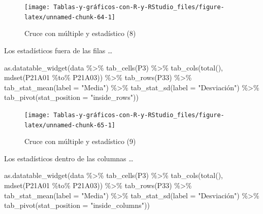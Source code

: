 \documentclass[
]{book}
\newenvironment{Shaded}{\begin{snugshade}}{\end{snugshade}}
\newcommand{\AttributeTok}[1]{\textcolor[rgb]{0.77,0.63,0.00}{#1}}
\newcommand{\FunctionTok}[1]{\textcolor[rgb]{0.00,0.00,0.00}{#1}}
\newcommand{\NormalTok}[1]{#1}
\newcommand{\SpecialCharTok}[1]{\textcolor[rgb]{0.00,0.00,0.00}{#1}}
\newcommand{\StringTok}[1]{\textcolor[rgb]{0.31,0.60,0.02}{#1}}
\begin{document}
\begin{figure}[H]

{\centering \texttt{[image: Tablas-y-gráficos-con-R-y-RStudio\_files/figure-latex/unnamed-chunk-64-1]} 

}

\caption{Cruce con múltiple y estadístico (8)}\label{fig:unnamed-chunk-64}
\end{figure}

Los estadísticos fuera de las filas \ldots{}

\begin{Shaded}
\begin{Highlighting}[]
\FunctionTok{as.datatable\_widget}\NormalTok{(data }\SpecialCharTok{\%\textgreater{}\%} \FunctionTok{tab\_cells}\NormalTok{(P3) }\SpecialCharTok{\%\textgreater{}\%} \FunctionTok{tab\_cols}\NormalTok{(}\FunctionTok{total}\NormalTok{(), }
  \FunctionTok{mdset}\NormalTok{(P21A01 }\SpecialCharTok{\%to\%}\NormalTok{ P21A03)) }\SpecialCharTok{\%\textgreater{}\%} \FunctionTok{tab\_rows}\NormalTok{(P33) }\SpecialCharTok{\%\textgreater{}\%} \FunctionTok{tab\_stat\_mean}\NormalTok{(}\AttributeTok{label =} \StringTok{"Media"}\NormalTok{) }\SpecialCharTok{\%\textgreater{}\%} 
  \FunctionTok{tab\_stat\_sd}\NormalTok{(}\AttributeTok{label =} \StringTok{"Desviación"}\NormalTok{) }\SpecialCharTok{\%\textgreater{}\%} \FunctionTok{tab\_pivot}\NormalTok{(}\AttributeTok{stat\_position =} \StringTok{"inside\_rows"}\NormalTok{))}
\end{Highlighting}
\end{Shaded}

\begin{figure}[H]

{\centering \texttt{[image: Tablas-y-gráficos-con-R-y-RStudio\_files/figure-latex/unnamed-chunk-65-1]} 

}

\caption{Cruce con múltiple y estadístico (9)}\label{fig:unnamed-chunk-65}
\end{figure}

Los estadísticos dentro de las columnas \ldots{}

\begin{Shaded}
\begin{Highlighting}[]
\FunctionTok{as.datatable\_widget}\NormalTok{(data }\SpecialCharTok{\%\textgreater{}\%} \FunctionTok{tab\_cells}\NormalTok{(P3) }\SpecialCharTok{\%\textgreater{}\%} \FunctionTok{tab\_cols}\NormalTok{(}\FunctionTok{total}\NormalTok{(), }
  \FunctionTok{mdset}\NormalTok{(P21A01 }\SpecialCharTok{\%to\%}\NormalTok{ P21A03)) }\SpecialCharTok{\%\textgreater{}\%} \FunctionTok{tab\_rows}\NormalTok{(P33) }\SpecialCharTok{\%\textgreater{}\%} \FunctionTok{tab\_stat\_mean}\NormalTok{(}\AttributeTok{label =} \StringTok{"Media"}\NormalTok{) }\SpecialCharTok{\%\textgreater{}\%} 
  \FunctionTok{tab\_stat\_sd}\NormalTok{(}\AttributeTok{label =} \StringTok{"Desviación"}\NormalTok{) }\SpecialCharTok{\%\textgreater{}\%} \FunctionTok{tab\_pivot}\NormalTok{(}\AttributeTok{stat\_position =} \StringTok{"inside\_columns"}\NormalTok{))}
\end{Highlighting}
\end{Shaded}
\end{document}
